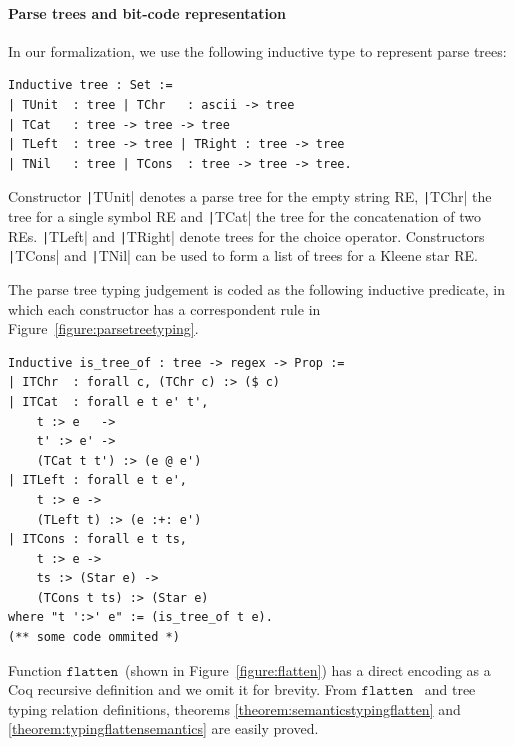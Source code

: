 \documentclass[review]{elsarticle}
\newcommand{\flatten}{\ensuremath{\texttt{flatten}}}
\newcommand{\coq}[1]{\texttt|#1|}
\theoremstyle{definition}
\begin{document}
\paragraph{Parse trees and bit-code representation}

In our formalization, we use the following inductive type to represent parse
trees:

\begin{verbatim}
Inductive tree : Set :=
| TUnit  : tree | TChr   : ascii -> tree
| TCat   : tree -> tree -> tree 
| TLeft  : tree -> tree | TRight : tree -> tree 
| TNil   : tree | TCons  : tree -> tree -> tree.
\end{verbatim}

Constructor \coq{TUnit} denotes a parse tree for the empty string RE,
\coq{TChr} the tree for a single symbol RE and \coq{TCat} the tree for
the concatenation of two REs. \coq{TLeft} and \coq{TRight} denote trees
for the choice operator. Constructors \coq{TCons} and \coq{TNil} can be
used to form a list of trees for a Kleene star RE.

The parse tree typing judgement is
coded as the following inductive predicate, in which each constructor
has a correspondent rule in Figure~\ref{figure:parsetreetyping}.

\begin{verbatim}
Inductive is_tree_of : tree -> regex -> Prop :=
| ITChr  : forall c, (TChr c) :> ($ c)
| ITCat  : forall e t e' t',
    t :> e   ->
    t' :> e' ->
    (TCat t t') :> (e @ e')
| ITLeft : forall e t e',
    t :> e ->
    (TLeft t) :> (e :+: e')
| ITCons : forall e t ts,
    t :> e ->
    ts :> (Star e) ->
    (TCons t ts) :> (Star e)
where "t ':>' e" := (is_tree_of t e).
(** some code ommited *)
\end{verbatim}
Function \flatten~(shown in Figure~\ref{figure:flatten}) has a direct encoding as a Coq recursive definition and
we omit it for brevity. From \flatten~ and tree typing relation definitions,
theorems \ref{theorem:semanticstypingflatten} and
\ref{theorem:typingflattensemantics} are easily proved.
\end{document}
